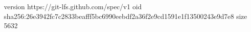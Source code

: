 version https://git-lfs.github.com/spec/v1
oid sha256:26e3942fc7c2833beafff5bc6990eebdf2a36f2e9cd1591e1f13500243e9d7e8
size 5632

